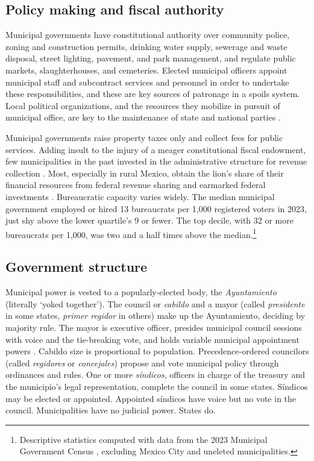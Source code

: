 \documentclass[letter,12pt]{article}
\begin{document}
\subsection{Policy making and fiscal authority}
Municipal governments have constitutional authority over community police, zoning and construction permits, drinking water supply, sewerage and waste disposal, street lighting, pavement, and park management, and regulate public markets, slaughterhouses, and cemeteries. Elected municipal officers appoint municipal staff and subcontract services and personnel in order to undertake these responsibilities, and these are key sources of patronage in a spoils system. Local political organizations, and the resources they mobilize in pursuit of municipal office, are key to the maintenance of state and national parties \citep{coppedge.MxVen.1993, key.1964, rosas.lucardi.Brokers.2019}. 

 

Municipal governments raise property taxes only and collect fees for public services. Adding insult to the injury of a meager constitutional fiscal endowment, few municipalities in the past invested in the administrative structure for revenue collection \citep{garfias.state.cap.2018}. Most, especially in rural Mexico, obtain the lion's share of their financial resources from federal revenue sharing and earmarked federal investments \citep{diaz.cayeros.2006, figueroa-mansur-itam.2024}. Bureaucratic capacity varies widely. The median municipal government employed or hired 13 bureaucrats per 1,000 registered voters in 2023, just shy above the lower quartile's 9 or fewer. The top decile, with 32 or more bureaucrats per 1,000, was two and a half times above the median.\footnote{Descriptive statistics computed with data from the 2023 Municipal Government Census \citep{inegi.CensoGobMun2023}, excluding Mexico City and uneleted municipalities.}

\subsection{Government structure}\label{S:structure}
Municipal power is vested to a popularly-elected body, the \emph{Ayuntamiento} (literally `yoked together'). The council or \emph{cabildo} and a mayor (called \emph{presidente} in some states, \emph{primer regidor} in others) make up the Ayuntamiento, deciding by majority rule. The mayor is executive officer, presides municipal council sessions with voice and the tie-breaking vote, and holds variable municipal appointment powers \citep{robles-mtz.Municipio.2009, rmz-millan.2000}. Cabildo size is proportional to population. Precedence-ordered councilors (called \emph{regidores} or \emph{concejales}) propose and vote municipal policy through ordinances and rules. One or more \emph{síndicos}, officers in charge of the treasury and the municipio's legal representation, complete the council in some states. Síndicos may be elected or appointed. Appointed síndicos have voice but no vote in the council. Municipalities have no judicial power. States do.
\end{document}
